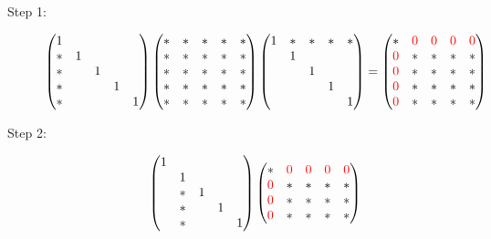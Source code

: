 \documentclass[ComputationalMathematics.tex]{subfiles}
\begin{document}
\begin{description}
  \item[{\sc Step 1:}]
    \[
\begin{pmatrix}
    1\\
    \ast & 1\\
    \ast & & 1\\
    \ast  & & & 1\\
    \ast & & & & 1
\end{pmatrix}
\begin{pmatrix}
    \ast & \ast & \ast & \ast & \ast\\
    \ast & \ast & \ast & \ast & \ast\\
    \ast & \ast & \ast & \ast & \ast\\
    \ast & \ast & \ast & \ast & \ast\\
    \ast & \ast & \ast & \ast & \ast\\
\end{pmatrix}
\begin{pmatrix}
    1 & \ast & \ast & \ast & \ast\\
    & 1\\
    & & 1\\
    & & & 1\\
    & & & & 1
\end{pmatrix}
=
\begin{pmatrix}
    \ast & {\color{red} 0} & {\color{red} 0} & {\color{red} 0} & {\color{red} 0}\\
    {\color{red} 0} & \ast & \ast & \ast & \ast\\
    {\color{red} 0} & \ast & \ast & \ast & \ast\\
    {\color{red} 0} & \ast & \ast & \ast & \ast\\
    {\color{red} 0} & \ast & \ast & \ast & \ast\\
\end{pmatrix}
\]
  \item[{\sc Step 2:}]
\[
\begin{pmatrix}
    1 & \\
    & 1\\
    & \ast & 1\\
    & \ast & & 1\\
    & \ast & & & 1
\end{pmatrix}
\begin{pmatrix}
    \ast & {\color{red} 0} & {\color{red} 0} & {\color{red} 0} & {\color{red} 0}\\
    {\color{red} 0} & \ast & \ast & \ast & \ast\\
    {\color{red} 0} & \ast & \ast & \ast & \ast\\
    {\color{red} 0} & \ast & \ast & \ast & \ast\\

\end{pmatrix}\]
\end{description}
\end{document}
